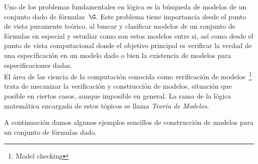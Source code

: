 \documentclass[11pt,letterpaper]{article}
\begin{document}
Uno de los problemas fundamentales en l\'ogica es la búsqueda de modelos de
un conjunto dado de fórmulas~$\G$. Este problema tiene importancia desde el 
punto de vista puramente te\'orico, al buscar y clasificar modelos de un 
conjunto de fórmulas en especial y estudiar como son estos modelos entre si,  
así como desde el punto de vista computacional donde el objetivo principal es 
verificar la verdad de una especificación en un modelo dado o bien la existencia 
de modelos para especificaciones dadas. \\
El área de las ciencia de la computación conocida como verificación de 
modelos~\footnote{Model checking} trata de mecanizar la verificación y 
construcción de modelos, situaci\'on que posible en ciertos casos, aunque 
imposible en general. La rama de la l\'ogica matemática encargada de estos 
tópicos se llama \emph{Teoría de Modelos}.

\espc

A continuación damos algunos ejemplos sencillos de construcción de modelos
para un conjunto de fórmulas dado.
\end{document}
